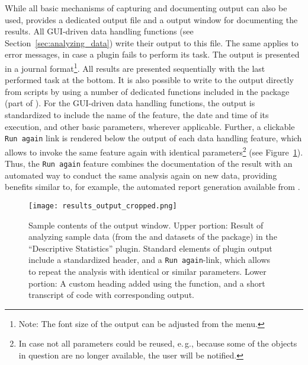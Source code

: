 While all basic mechanisms of
capturing and documenting  output can also
be used,  provides a dedicated output file and a output
window for documenting the results. All GUI-driven data handling
functions (see Section~\ref{sec:analyzing_data}) write their output to this file. 
The same applies to error messages, in case a plugin fails to perform its task.
The output is presented in a journal format\footnote{Note: The font size of the output can be adjusted
from the menu. 
}. All results are presented
sequentially with the last performed task at the bottom.
It is also possible to write to the output directly from 
scripts by using a number of dedicated 
functions included in the  package (part of ). For the GUI-driven data handling functions, the output is
standardized to include the name of the feature, the date and time of
its execution, and other basic parameters, wherever
applicable. Further, a clickable \texttt{Run
again} link is rendered below the output of each data
handling feature, which allows to invoke the same feature again with
identical parameters\footnote{In case not all parameters could be
reused, e.\,g., because some of the objects in
question are no longer available, the user will be notified.} (see
Figure~\ref{fig:results_output}). Thus, the \texttt{Run
again} feature combines the documentation of the result
with an automated way to conduct the same analysis again on new
data, providing benefits similar to, for example, the automated report generation
available from  \citep{RaffelsbergerW2008}.

\begin{figure}[t!]
 \centering
 \texttt{[image: results\_output\_cropped.png]}
 \caption{Sample contents of the output window. Upper portion: Result of analyzing sample data (from the
 and 
  datasets of the  package) in the ``Descriptive Statistics'' plugin. Standard elements of
  plugin output include a standardized header, and a  \texttt{Run again}-link, which allows to repeat the
  analysis with identical or similar parameters. Lower portion: A custom heading added using the
   function, and a short transcript of  code with corresponding output.}
 \label{fig:results_output}
\end{figure}

